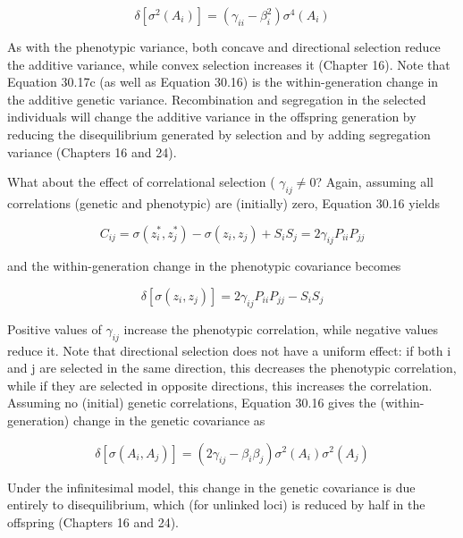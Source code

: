 \documentclass{article}
\begin{document}
\begin{equation}
\delta\left[\sigma^{2}(A_{i})\right]=\left(\gamma_{i i}-\beta_{i}^{2}\right)\sigma^{4}(A_{i})
\tag{30.17c}
\label{eq:30_17c}
\end{equation}

As with the phenotypic variance, both concave and directional selection reduce the additive variance, while convex selection increases it (Chapter 16). Note that Equation 30.17c (as well as Equation 30.16) is the within-generation change in the additive genetic variance. Recombination and segregation in the selected individuals will change the additive variance in the offspring generation by reducing the disequilibrium generated by selection and by adding segregation variance (Chapters 16 and 24).

What about the effect of correlational selection ( $ \gamma_{ij} \neq 0 $? Again, assuming all correlations (genetic and phenotypic) are (initially) zero, Equation 30.16 yields

\begin{equation}
C_{i j}=\sigma(z_{i}^{*},z_{j}^{*})-\sigma(z_{i},z_{j})+S_{i}S_{j}=2\gamma_{i j}P_{i i}P_{j j}
\tag{30.18a}
\label{eq:30_18a}
\end{equation}

and the within-generation change in the phenotypic covariance becomes

\begin{equation}
\delta\left[\sigma(z_{i},z_{j})\right]=2\gamma_{i j}P_{i i}P_{j j}-S_{i}S_{j}
\tag{30.18b}
\label{eq:30_18b}
\end{equation}

Positive values of  $ \gamma_{ij} $ increase the phenotypic correlation, while negative values reduce it. Note that directional selection does not have a uniform effect: if both i and j are selected in the same direction, this decreases the phenotypic correlation, while if they are selected in opposite directions, this increases the correlation. Assuming no (initial) genetic correlations, Equation 30.16 gives the (within-generation) change in the genetic covariance as

\begin{equation}
\delta\left[\sigma(A_{i},A_{j})\right]=\left(2\gamma_{i j}-\beta_{i}\beta_{j}\right)\sigma^{2}(A_{i})\sigma^{2}(A_{j})
\tag{30.18c}
\label{eq:30_18c}
\end{equation}

Under the infinitesimal model, this change in the genetic covariance is due entirely to disequilibrium, which (for unlinked loci) is reduced by half in the offspring (Chapters 16 and 24).
\end{document}
